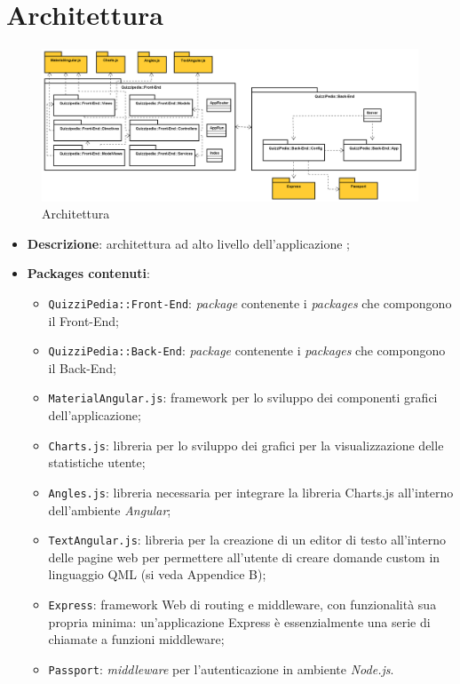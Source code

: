 \newpage

\section{Architettura}
\label{Architettura}
\begin{figure}[ht]
	\centering
	\includegraphics[scale=0.35]{UML/Package/QuizziPedia.png}
	\caption{Architettura}
\end{figure}
\FloatBarrier
\begin{itemize}
	\item \textbf{Descrizione}: architettura ad alto livello dell'applicazione \progetto;
	\item \textbf{Packages contenuti}:
	\begin{itemize}
		\item \texttt{QuizziPedia::Front-End}: \textit{package} contenente i \textit{packages} che compongono il Front-End;
		\item \texttt{QuizziPedia::Back-End}: \textit{package} contenente i \textit{packages} che compongono il Back-End;
		\item \texttt{MaterialAngular.js}: framework per lo sviluppo dei componenti grafici dell'applicazione;
		\item \texttt{Charts.js}: libreria per lo sviluppo dei grafici per la visualizzazione delle statistiche utente;
		\item \texttt{Angles.js}: libreria necessaria per integrare la libreria Charts.js all'interno dell'ambiente \textit{Angular};
		\item \texttt{TextAngular.js}: libreria per la creazione di un editor di testo all'interno delle pagine web per permettere all'utente di creare domande custom in linguaggio QML (si veda Appendice B);
		\item \texttt{Express}: framework Web di routing e middleware, con funzionalità sua propria minima: un’applicazione Express è essenzialmente una serie di chiamate a funzioni middleware;
		\item \texttt{Passport}: \textit{middleware} per l'autenticazione in ambiente \textit{Node.js}.
	\end{itemize}
\end{itemize}
